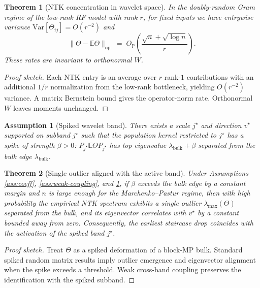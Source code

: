 \documentclass[11pt]{article}
\newtheorem{assumption}{Assumption}
\newtheorem{theorem}{Theorem}
\theoremstyle{remark}
\begin{document}
\begin{theorem}[NTK concentration in wavelet space]\label{thm:concentration}
In the doubly-random Gram regime of the low-rank RF model with rank $r$, for fixed inputs we have entrywise variance $\mathrm{Var}[\Theta_{ij}] = O(r^{-2})$ and
\[
\|\Theta - \mathbb{E}\Theta\|_{\mathrm{op}} \;=\; O_{\mathbb{P}}\!\left(\frac{\sqrt{n} + \sqrt{\log n}}{r}\right).
\]
These rates are invariant to orthonormal $W$.
\end{theorem}

\begin{proof}[Proof sketch]
Each NTK entry is an average over $r$ rank-$1$ contributions with an additional $1/r$ normalization from the low-rank bottleneck, yielding $O(r^{-2})$ variance. A matrix Bernstein bound gives the operator-norm rate. Orthonormal $W$ leaves moments unchanged.
\end{proof}

\begin{assumption}[Spiked wavelet band]\label{ass:spike}
There exists a scale $j^\star$ and direction $v^\star$ supported on subband $j^\star$ such that the population kernel restricted to $j^\star$ has a spike of strength $\beta>0$: $P_{j^\star} \mathbb{E}\Theta P_{j^\star}$ has top eigenvalue $\lambda_\mathrm{bulk} + \beta$ separated from the bulk edge $\lambda_\mathrm{bulk}$.
\end{assumption}

\begin{theorem}[Single outlier aligned with the active band]\label{thm:outlier}
Under Assumptions \ref{ass:coeff}, \ref{ass:weak-coupling}, and \ref{ass:spike}, if $\beta$ exceeds the bulk edge by a constant margin and $n$ is large enough for the Marchenko--Pastur regime, then with high probability the empirical NTK spectrum exhibits a single outlier $\lambda_{\max}(\Theta)$ separated from the bulk, and its eigenvector correlates with $v^\star$ by a constant bounded away from zero. Consequently, the earliest staircase drop coincides with the activation of the spiked band $j^\star$.
\end{theorem}

\begin{proof}[Proof sketch]
Treat $\Theta$ as a spiked deformation of a block-MP bulk. Standard spiked random matrix results imply outlier emergence and eigenvector alignment when the spike exceeds a threshold. Weak cross-band coupling preserves the identification with the spiked subband.
\end{proof}
\end{document}
